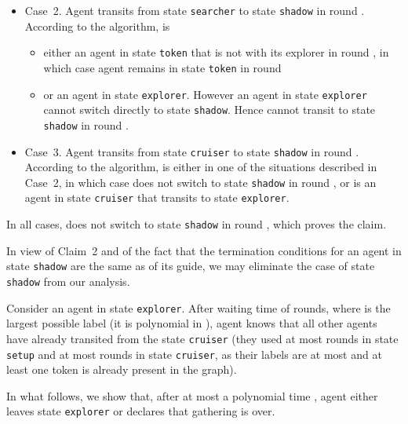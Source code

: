 \documentclass[11pt]{article}
\newcommand{\finclaim}{\hfill }
\newcommand{\qed}{\hfill  \bigbreak}
\newenvironment{proof}{\noindent {\bf Proof.}}{\qed}
\begin{document}
\begin{proof}
\begin{itemize}
\item{{Case~2.} Agent  transits from state {\tt searcher} to state {\tt shadow} in round . According to the algorithm,  is }
\begin{itemize}
\item{ either an agent in state {\tt token} that is not with its explorer in round , in which case agent  remains in state {\tt token} in round }
\item{ or an agent in state {\tt explorer}. However an agent in state {\tt explorer} cannot switch directly to state {\tt shadow}. Hence  cannot transit to
state {\tt shadow} in round . }
\end{itemize}
\item{ {Case~3.} Agent  transits from state {\tt cruiser} to state {\tt shadow} in round . According to the algorithm,  is either in one of the situations described in Case~2, in which case  does not switch to state {\tt shadow} in round , or  is an agent in state {\tt cruiser} that transits to state {\tt explorer}.} 
\end{itemize}

{In all cases,  does not switch to state {\tt shadow} in round , which proves the claim.} \finclaim

{In view of Claim~2 and of the fact that} the termination  conditions for an agent in state 
 {\tt shadow} are the same as of its guide, we may eliminate the case of state  {\tt shadow} from our analysis. 

{Consider an agent  in state {\tt explorer}}. After 
  waiting time of  {   rounds}, where  is the largest possible label (it is polynomial in ),
 agent  knows that all other agents have already transited from the state {\tt cruiser}
 (they used at most {} rounds in state {\tt setup} and at most   rounds in state  {\tt cruiser}, as their labels are at most  and 
 at least one token is already present in the graph).


{In what follows, we show that, after at most a polynomial time , agent  either leaves state {\tt explorer} or declares that gathering is over.}  
 



\end{proof}
\end{document}

